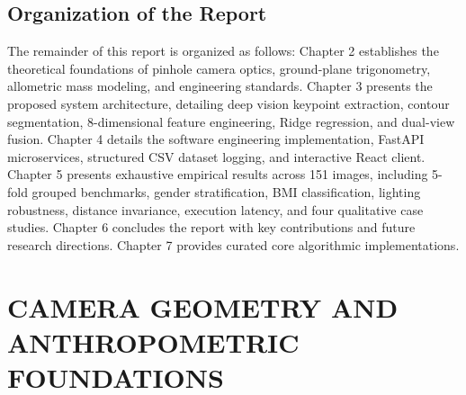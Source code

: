 \documentclass[12pt,a4paper,oneside]{report}
\begin{document}
\section{Organization of the Report}
The remainder of this report is organized as follows: Chapter 2 establishes the theoretical foundations of pinhole camera optics, ground-plane trigonometry, allometric mass modeling, and engineering standards. Chapter 3 presents the proposed system architecture, detailing deep vision keypoint extraction, contour segmentation, 8-dimensional feature engineering, Ridge regression, and dual-view fusion. Chapter 4 details the software engineering implementation, FastAPI microservices, structured CSV dataset logging, and interactive React client. Chapter 5 presents exhaustive empirical results across 151 images, including 5-fold grouped benchmarks, gender stratification, BMI classification, lighting robustness, distance invariance, execution latency, and four qualitative case studies. Chapter 6 concludes the report with key contributions and future research directions. Chapter 7 provides curated core algorithmic implementations.

\chapter{CAMERA GEOMETRY AND ANTHROPOMETRIC FOUNDATIONS}
\end{document}
